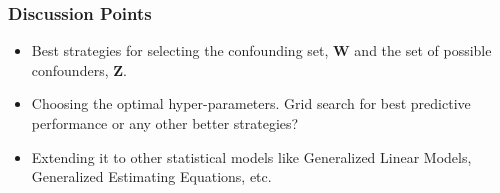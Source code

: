 \documentclass{beamer}
\begin{document}
\begin{frame}
	\frametitle{Discussion Points}
	\begin{itemize}
		\item Best strategies for selecting the confounding set, $
			\bm{W} $ and the set of possible confounders, $ \bm{Z}
			$.
		\item Choosing the optimal hyper-parameters. Grid search for best 
			predictive performance or any other better strategies?
		\item Extending it to other statistical models like Generalized
			Linear Models, Generalized Estimating Equations, etc.
	\end{itemize}
\end{frame}
\end{document}
